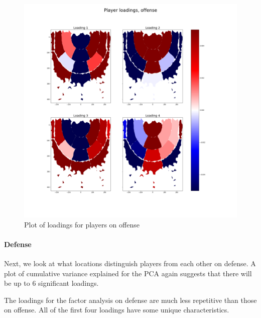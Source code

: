 \documentclass[]{article}
\let\oldparagraph\paragraph
\renewcommand{\paragraph}[1]{\oldparagraph{#1}\mbox{}}
\begin{document}
\begin{figure}
\centering
\includegraphics{first_4_loadings_players_off.png}
\caption{Plot of loadings for players on offense}
\end{figure}

\hypertarget{defense}{%
\paragraph{Defense}\label{defense}}

Next, we look at what locations distinguish players from each other on
defense. A plot of cumulative variance explained for the PCA again
suggests that there will be up to 6 significant loadings.

The loadings for the factor analysis on defense are much less repetitive
than those on offense. All of the first four loadings have some unique
characteristics.
\end{document}
